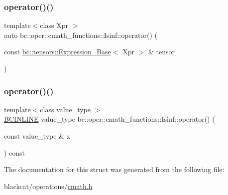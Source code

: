 \mbox{\label{structbc_1_1oper_1_1cmath__functions_1_1Isinf_aa23ead2c5eacba5034712fa484a78aa7}} 
\subsubsection{\texorpdfstring{operator()()}{operator()()}\hspace{0.1cm}{\footnotesize\ttfamily [2/3]}}
{\footnotesize\ttfamily template$<$class Xpr $>$ \\
auto bc\+::oper\+::cmath\+\_\+functions\+::\+Isinf\+::operator() (\begin{DoxyParamCaption}\item[{const \hyperlink{classbc_1_1tensors_1_1Expression__Base}{bc\+::tensors\+::\+Expression\+\_\+\+Base}$<$ Xpr $>$ \&}]{tensor }\end{DoxyParamCaption})\hspace{0.3cm}{\ttfamily [inline]}}

\mbox{\label{structbc_1_1oper_1_1cmath__functions_1_1Isinf_a665230e22bbb36c3ab950833d8388512}} 
\subsubsection{\texorpdfstring{operator()()}{operator()()}\hspace{0.1cm}{\footnotesize\ttfamily [3/3]}}
{\footnotesize\ttfamily template$<$class value\+\_\+type $>$ \\
\hyperlink{common_8h_a6699e8b0449da5c0fafb878e59c1d4b1}{B\+C\+I\+N\+L\+I\+NE} value\+\_\+type bc\+::oper\+::cmath\+\_\+functions\+::\+Isinf\+::operator() (\begin{DoxyParamCaption}\item[{const value\+\_\+type \&}]{x }\end{DoxyParamCaption}) const\hspace{0.3cm}{\ttfamily [inline]}}



The documentation for this struct was generated from the following file\+:\begin{DoxyCompactItemize}
\item 
blackcat/operations/\hyperlink{cmath_8h}{cmath.\+h}\end{DoxyCompactItemize}
